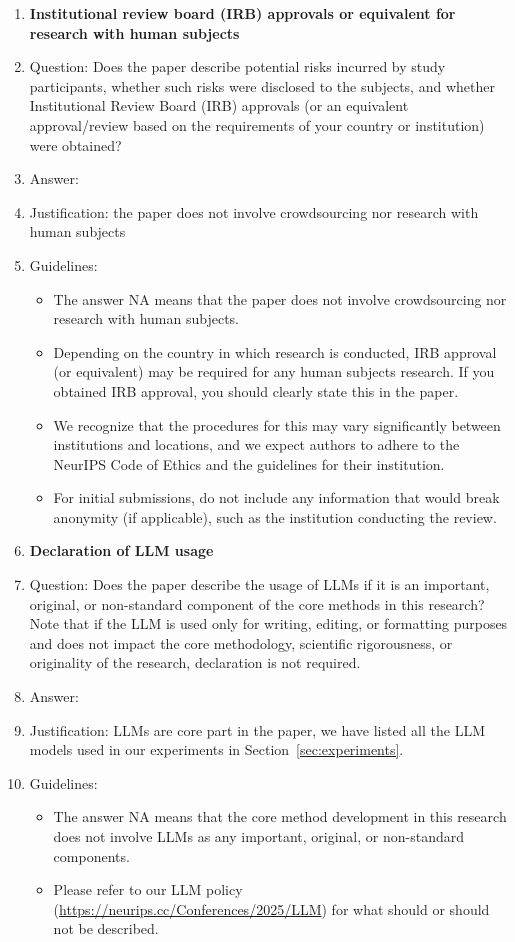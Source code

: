 \begin{enumerate}
\item {\bf Institutional review board (IRB) approvals or equivalent for research with human subjects}
    \item[] Question: Does the paper describe potential risks incurred by study participants, whether such risks were disclosed to the subjects, and whether Institutional Review Board (IRB) approvals (or an equivalent approval/review based on the requirements of your country or institution) were obtained?
    \item[] Answer: \answerNA{}%
    \item[] Justification: the paper does not involve crowdsourcing nor research with human subjects
    \item[] Guidelines:
    \begin{itemize}
        \item The answer NA means that the paper does not involve crowdsourcing nor research with human subjects.
        \item Depending on the country in which research is conducted, IRB approval (or equivalent) may be required for any human subjects research. If you obtained IRB approval, you should clearly state this in the paper. 
        \item We recognize that the procedures for this may vary significantly between institutions and locations, and we expect authors to adhere to the NeurIPS Code of Ethics and the guidelines for their institution. 
        \item For initial submissions, do not include any information that would break anonymity (if applicable), such as the institution conducting the review.
    \end{itemize}

\item {\bf Declaration of LLM usage}
    \item[] Question: Does the paper describe the usage of LLMs if it is an important, original, or non-standard component of the core methods in this research? Note that if the LLM is used only for writing, editing, or formatting purposes and does not impact the core methodology, scientific rigorousness, or originality of the research, declaration is not required.
    \item[] Answer: \answerYes{} %
    \item[] Justification: LLMs are core part in the paper, we have listed all the LLM models used in our experiments in Section~\ref{sec:experiments}.
    \item[] Guidelines:
    \begin{itemize}
        \item The answer NA means that the core method development in this research does not involve LLMs as any important, original, or non-standard components.
        \item Please refer to our LLM policy (\url{https://neurips.cc/Conferences/2025/LLM}) for what should or should not be described.
    \end{itemize}

\end{enumerate}
